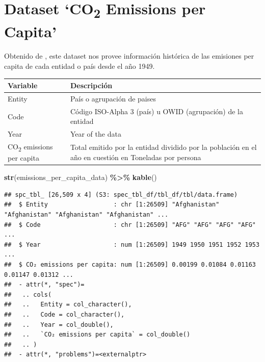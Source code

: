 \documentclass[
]{book}
\newenvironment{Shaded}{\begin{snugshade}}{\end{snugshade}}
\newcommand{\FunctionTok}[1]{\textcolor[rgb]{0.13,0.29,0.53}{\textbf{#1}}}
\newcommand{\NormalTok}[1]{#1}
\newcommand{\SpecialCharTok}[1]{\textcolor[rgb]{0.81,0.36,0.00}{\textbf{#1}}}
\begin{document}
\section{\texorpdfstring{Dataset `CO\textsubscript{2} Emissions per Capita'}{Dataset `CO2 Emissions per Capita'}}\label{dataset-co2-emissions-per-capita}

Obtenido de \citep{ref1}, este dataset nos provee información histórica de las emisiones per capita de cada entidad o país desde el año 1949.

\begin{longtable}[]{@{}
  >{\raggedright\arraybackslash}p{}
  >{\raggedright\arraybackslash}p{}@{}}
\toprule\noalign{}
\begin{minipage}[b]{\linewidth}\raggedright
Variable
\end{minipage} & \begin{minipage}[b]{\linewidth}\raggedright
Descripción
\end{minipage} \\
\midrule\noalign{}
\endhead
\bottomrule\noalign{}
\endlastfoot
Entity & País o agrupación de paises \\
Code & Código ISO-Alpha 3 (país) u OWID (agrupación) de la entidad \\
Year & Year of the data \\
CO\textsubscript{2} emissions per capita & Total emitido por la entidad dividido por la población en el año en cuestión en Toneladas por persona \\
\end{longtable}

\begin{Shaded}
\begin{Highlighting}[]
\FunctionTok{str}\NormalTok{(emissions\_per\_capita\_data) }\SpecialCharTok{\%\textgreater{}\%} \FunctionTok{kable}\NormalTok{()}
\end{Highlighting}
\end{Shaded}

\begin{verbatim}
## spc_tbl_ [26,509 x 4] (S3: spec_tbl_df/tbl_df/tbl/data.frame)
##  $ Entity                  : chr [1:26509] "Afghanistan" "Afghanistan" "Afghanistan" "Afghanistan" ...
##  $ Code                    : chr [1:26509] "AFG" "AFG" "AFG" "AFG" ...
##  $ Year                    : num [1:26509] 1949 1950 1951 1952 1953 ...
##  $ CO₂ emissions per capita: num [1:26509] 0.00199 0.01084 0.01163 0.01147 0.01312 ...
##  - attr(*, "spec")=
##   .. cols(
##   ..   Entity = col_character(),
##   ..   Code = col_character(),
##   ..   Year = col_double(),
##   ..   `CO₂ emissions per capita` = col_double()
##   .. )
##  - attr(*, "problems")=<externalptr>
\end{verbatim}
\end{document}
